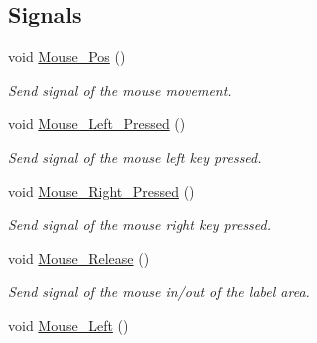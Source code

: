 \subsection*{Signals}
\begin{DoxyCompactItemize}
\item 
\hypertarget{classQCustomLabel_a45deee93a6a40df2979492a2ff680c88}{void \hyperlink{classQCustomLabel_a45deee93a6a40df2979492a2ff680c88}{Mouse\-\_\-\-Pos} ()}\label{classQCustomLabel_a45deee93a6a40df2979492a2ff680c88}

\begin{DoxyCompactList}\small\item\em Send signal of the mouse movement. \end{DoxyCompactList}\item 
\hypertarget{classQCustomLabel_a6c990d236a4ff2e2898a3e84cd130f9b}{void \hyperlink{classQCustomLabel_a6c990d236a4ff2e2898a3e84cd130f9b}{Mouse\-\_\-\-Left\-\_\-\-Pressed} ()}\label{classQCustomLabel_a6c990d236a4ff2e2898a3e84cd130f9b}

\begin{DoxyCompactList}\small\item\em Send signal of the mouse left key pressed. \end{DoxyCompactList}\item 
\hypertarget{classQCustomLabel_a221ee1658fe8b86dbcc9036e7b740ab8}{void \hyperlink{classQCustomLabel_a221ee1658fe8b86dbcc9036e7b740ab8}{Mouse\-\_\-\-Right\-\_\-\-Pressed} ()}\label{classQCustomLabel_a221ee1658fe8b86dbcc9036e7b740ab8}

\begin{DoxyCompactList}\small\item\em Send signal of the mouse right key pressed. \end{DoxyCompactList}\item 
\hypertarget{classQCustomLabel_a1725399a11e80f0c79f3d1c63cf505ef}{void \hyperlink{classQCustomLabel_a1725399a11e80f0c79f3d1c63cf505ef}{Mouse\-\_\-\-Release} ()}\label{classQCustomLabel_a1725399a11e80f0c79f3d1c63cf505ef}

\begin{DoxyCompactList}\small\item\em Send signal of the mouse in/out of the label area. \end{DoxyCompactList}\item 
\hypertarget{classQCustomLabel_ae5fe8fd62adb9568cfa6d412d6a62948}{void \hyperlink{classQCustomLabel_ae5fe8fd62adb9568cfa6d412d6a62948}{Mouse\-\_\-\-Left} ()}\label{classQCustomLabel_ae5fe8fd62adb9568cfa6d412d6a62948}


\end{DoxyCompactItemize}
